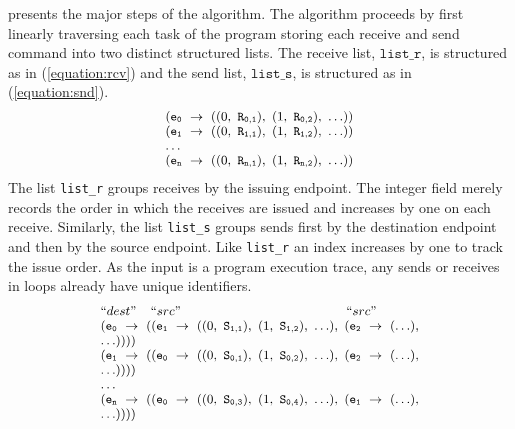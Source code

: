  presents the major steps of the algorithm. The algorithm proceeds by first linearly traversing each task of the program storing each receive and send command into two distinct structured lists. The receive list, $\mathtt{list\_r}$, is structured as in (\ref{equation:rcv}) and the send list, $\mathtt{list\_s}$, is structured as in (\ref{equation:snd}).
\begin{equation}
\footnotesize \begin{array}{l}
(\mathtt{e_0}\ \rightarrow\ ((0,\ \mathtt{R_{0,1}}),\ (1,\ \mathtt{R_{0,2}}),\ \ldots))\\
(\mathtt{e_1}\ \rightarrow\ ((0,\ \mathtt{R_{1,1}}),\ (1,\ \mathtt{R_{1,2}}),\ \ldots))\\
\ldots \\
(\mathtt{e_n}\ \rightarrow\ ((0,\ \mathtt{R_{n,1}}),\ (1,\ \mathtt{R_{n,2}}),\ \ldots))\\
\end{array}
\label{equation:rcv}
\end{equation}
The list \texttt{list\_r} groups receives by the issuing endpoint. The
integer field merely records the order in which the receives are
issued and increases by one on each receive. Similarly, the
list \texttt{list\_s} groups sends first by the destination endpoint
and then by the source endpoint. Like \texttt{list\_r} an index
increases by one to track the issue order. As the input is a
program execution trace, any sends or receives in loops already have
unique identifiers.
\begin{equation}
\footnotesize \begin{array}{l}
 ``dest" \;\;\;\; ``src" \;\;\;\;\;\;\;\;\;\;\;\;\;\;\;\;\;\;\;\;\;\;\;\;\;\;\;\;\;\;\;\;\;\;\;\;\;\;\;\;\;\;\;\;\;\; ``src"\\
(\mathtt{e_0}\ \rightarrow\ ((\mathtt{e_1}\ \rightarrow\ ((0,\ \mathtt{S_{1,1}}),\ (1,\ \mathtt{S_{1,2}}),\ \ldots),\ (\mathtt{e_2}\ \rightarrow\ (\ldots),\\ \ldots))))\\
(\mathtt{e_1}\ \rightarrow\ ((\mathtt{e_0}\ \rightarrow\ ((0,\ \mathtt{S_{0,1}}),\ (1,\ \mathtt{S_{0,2}}),\ \ldots),\ (\mathtt{e_2}\ \rightarrow\ (\ldots),\\ \ldots))))\\
 \dots\\
(\mathtt{e_n}\ \rightarrow\ ((\mathtt{e_0}\ \rightarrow\ ((0,\ \mathtt{S_{0,3}}),\ (1,\ \mathtt{S_{0,4}}),\ \ldots),\ (\mathtt{e_1}\ \rightarrow\ (\ldots),\\ \ldots))))\\
\end{array}
\label{equation:snd}
\end{equation}

